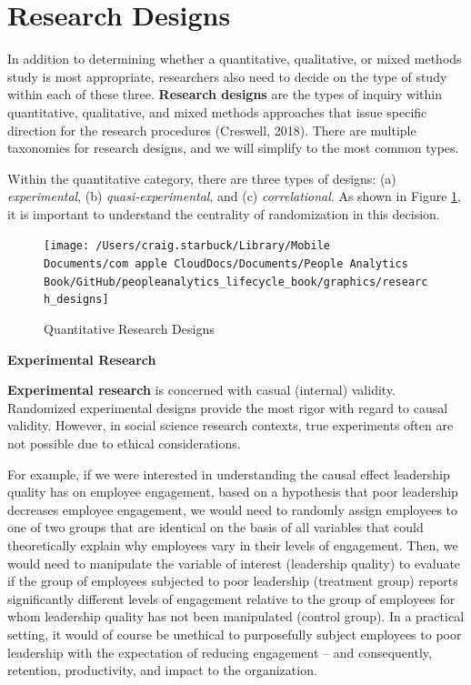\documentclass[
]{book}
\begin{document}
\hypertarget{research-designs}{%
\section{Research Designs}\label{research-designs}}

In addition to determining whether a quantitative, qualitative, or mixed methods study is most appropriate, researchers also need to decide on the type of study within each of these three. \textbf{Research designs} are the types of inquiry within quantitative, qualitative, and mixed methods approaches that issue specific direction for the research procedures (Creswell, 2018). There are multiple taxonomies for research designs, and we will simplify to the most common types.

Within the quantitative category, there are three types of designs: (a) \emph{experimental}, (b) \emph{quasi-experimental}, and (c) \emph{correlational}. As shown in Figure \ref{fig:res-designs}, it is important to understand the centrality of randomization in this decision.

\begin{figure}

{\centering \texttt{[image: /Users/craig.starbuck/Library/Mobile Documents/com~apple~CloudDocs/Documents/People Analytics Book/GitHub/peopleanalytics\_lifecycle\_book/graphics/research\_designs]} 

}

\caption{Quantitative Research Designs}\label{fig:res-designs}
\end{figure}

\textbf{Experimental Research}

\textbf{Experimental research} is concerned with casual (internal) validity. Randomized experimental designs provide the most rigor with regard to causal validity. However, in social science research contexts, true experiments often are not possible due to ethical considerations.

For example, if we were interested in understanding the causal effect leadership quality has on employee engagement, based on a hypothesis that poor leadership decreases employee engagement, we would need to randomly assign employees to one of two groups that are identical on the basis of all variables that could theoretically explain why employees vary in their levels of engagement. Then, we would need to manipulate the variable of interest (leadership quality) to evaluate if the group of employees subjected to poor leadership (treatment group) reports significantly different levels of engagement relative to the group of employees for whom leadership quality has not been manipulated (control group). In a practical setting, it would of course be unethical to purposefully subject employees to poor leadership with the expectation of reducing engagement -- and consequently, retention, productivity, and impact to the organization.
\end{document}
